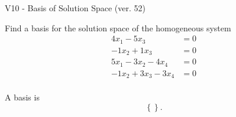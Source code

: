 \begin{exercise}
  \begin{exerciseTitle}V10 - Basis of Solution Space (ver. 52)\end{exerciseTitle}
  \begin{exerciseStatement}
    Find a basis for the solution space of the homogeneous system 
\begin{align*}
 4 x_ 1 -5 x_ 3 &= 0  \\ 
  -1 x_ 2 + 1 x_ 3 &= 0  \\ 
  5 x_ 1 -3 x_ 2 -4 x_ 4 &= 0  \\ 
  -1 x_ 2 + 3 x_ 3 -3 x_ 4 &= 0  \\ 
 \end{align*}


 
  \end{exerciseStatement}

  \begin{exerciseAnswer}
   A basis is   
\[\left\{\right\}.\]

  


  \end{exerciseAnswer}
\end{exercise}